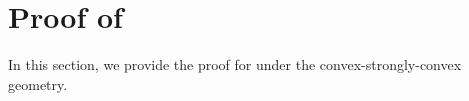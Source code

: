 \documentclass{osudissert96}
\begin{document}

\section{Proof of }\label{apep:mainconvexs}
In this section, we provide the proof for  under the convex-strongly-convex geometry.  

\end{document}
